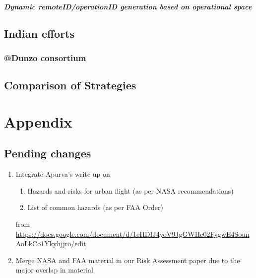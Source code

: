 \documentclass{ua_wgs_base}
\begin{document}
\paragraph{Dynamic remoteID/operationID generation based on operational space}

\section{Indian efforts}

\subsection{@Dunzo consortium}

\section{Comparison of Strategies}

\chapter{Appendix}

\section{Pending changes}

\begin{enumerate}

	\item Integrate Apurva's write up on
	\begin{enumerate}
		\item Hazards and risks for urban flight (as per NASA recommendations)
		\item List of common hazards (as per FAA Order)
	\end{enumerate}
from \href{doc}{https://docs.google.com/document/d/1eHDIJ4yoV9JgGWHc02FygwE4SounAoLkCo1Ykyhjjro/edit}
\item Merge NASA and FAA material in our Risk Assessment paper due to the major overlap in material

\end{enumerate}



\end{document}
